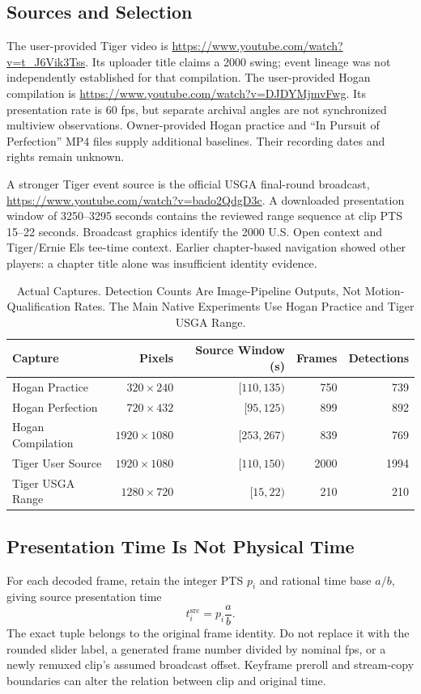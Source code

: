 \documentclass[11pt,letterpaper]{article}
\begin{document}
\subsection{Sources and Selection}
The user-provided Tiger video is \url{https://www.youtube.com/watch?v=t_J6Vik3Tss}.
Its uploader title claims a 2000 swing; event lineage was not independently
established for that compilation. The user-provided Hogan compilation is
\url{https://www.youtube.com/watch?v=DJDYMjmvFwg}. Its presentation rate is 60 fps,
but separate archival angles are not synchronized multiview observations.
Owner-provided Hogan practice and ``In Pursuit of Perfection'' MP4 files supply
additional baselines. Their recording dates and rights remain unknown.

A stronger Tiger event source is the official USGA final-round broadcast,
\url{https://www.youtube.com/watch?v=bado2QdgD3c}. A downloaded presentation
window of 3250--3295 seconds contains the reviewed range sequence at clip PTS
15--22 seconds. Broadcast graphics identify the 2000 U.S. Open context and
Tiger/Ernie Els tee-time context. Earlier chapter-based navigation showed other
players: a chapter title alone was insufficient identity evidence.

\begin{table}[ht]
\centering\small
\begin{tabular}{@{}lrrrr@{}}
\toprule
Capture & Pixels & Source Window (s) & Frames & Detections\\\midrule
Hogan Practice & $320\times240$ & $[110,135)$ & 750 & 739\\
Hogan Perfection & $720\times432$ & $[95,125)$ & 899 & 892\\
Hogan Compilation & $1920\times1080$ & $[253,267)$ & 839 & 769\\
Tiger User Source & $1920\times1080$ & $[110,150)$ & 2000 & 1994\\
Tiger USGA Range & $1280\times720$ & $[15,22)$ & 210 & 210\\
\bottomrule
\end{tabular}
\caption{Actual Captures. Detection Counts Are Image-Pipeline Outputs, Not
Motion-Qualification Rates. The Main Native Experiments Use Hogan Practice and
Tiger USGA Range.}
\end{table}

\subsection{Presentation Time Is Not Physical Time}
For each decoded frame, retain the integer PTS $p_i$ and rational time base
$a/b$, giving source presentation time
\begin{equation}t_i^{\mathrm{src}}=p_i\frac{a}{b}.\end{equation}
The exact tuple belongs to the original frame identity. Do not replace it with
the rounded slider label, a generated frame number divided by nominal fps,
or a newly remuxed clip's assumed broadcast offset. Keyframe preroll and
stream-copy boundaries can alter the relation between clip and original time.
\end{document}
